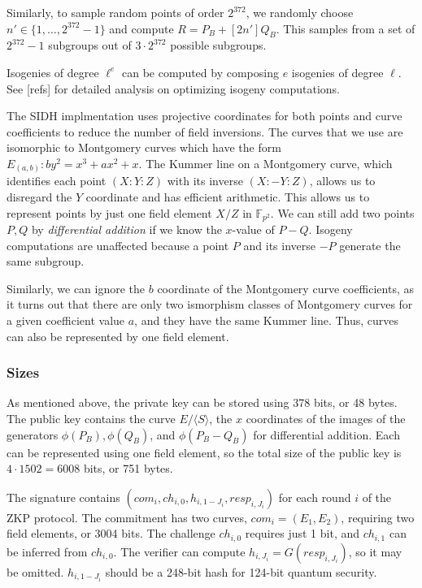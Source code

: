 \documentclass{amsart}
\theoremstyle{plain}
\theoremstyle{remark}
\numberwithin{equation}{section}
\begin{document}
Similarly, to sample random points of order $2^{372}$, we randomly choose $n' \in \{1,\dots,2^{372}-1\}$ and compute $R = P_B + [2n']Q_B$. This samples from a set of $2^{372}-1$ subgroups out of $3\cdot 2^{372}$ possible subgroups. 

Isogenies of degree $\ell^e$ can be computed by composing $e$ isogenies of degree $\ell$. See [refs] for detailed analysis on optimizing isogeny computations.

The SIDH implmentation uses projective coordinates for both points and curve coefficients to reduce the number of field inversions. The curves that we use are isomorphic to Montgomery curves which have the form $E_{(a,b)}: by^2 = x^3+ax^2+x$. The Kummer line on a Montgomery curve, which identifies each point $(X:Y:Z)$ with its inverse $(X:-Y:Z)$, allows us to disregard the $Y$ coordinate and has efficient arithmetic. This allows us to represent points by just one field element $X/Z$ in $\mathbb{F}_{p^2}$. We can still add two points $P,Q$ by \emph{differential addition} if we know the $x$-value of $P-Q$. Isogeny computations are unaffected because a point $P$ and its inverse $-P$ generate the same subgroup.  

Similarly, we can ignore the $b$ coordinate of the Montgomery curve coefficients, as it turns out that there are only two ismorphism classes of Montgomery curves for a given coefficient value $a$, and they have the same Kummer line. Thus, curves can also be represented by one field element.




\subsubsection{Sizes}
As mentioned above, the private key can be stored using 378 bits, or 48 bytes. The public key contains the curve $E/\langle S \rangle$, the $x$ coordinates of the images of the generators $\phi(P_B),\phi(Q_B)$, and $\phi(P_B-Q_B)$ for differential addition. Each can be represented using one field element, so the total size of the public key is $4 \cdot 1502 = 6008$ bits, or 751 bytes.

The signature contains $(com_i, ch_{i,0}, h_{i,1-J_i}, resp_{i,J_i})$ for each round $i$ of the ZKP protocol. The commitment has two curves, $com_i=(E_1,E_2)$, requiring two field elements, or 3004 bits. The challenge $ch_{i,0}$ requires just 1 bit, and $ch_{i,1}$ can be inferred from $ch_{i,0}$. The verifier can compute $h_{i,J_i} = G(resp_{i,J_i})$, so it may be omitted. $h_{i,1-J_i}$ should be a 248-bit hash for 124-bit quantum security. 
\end{document}
